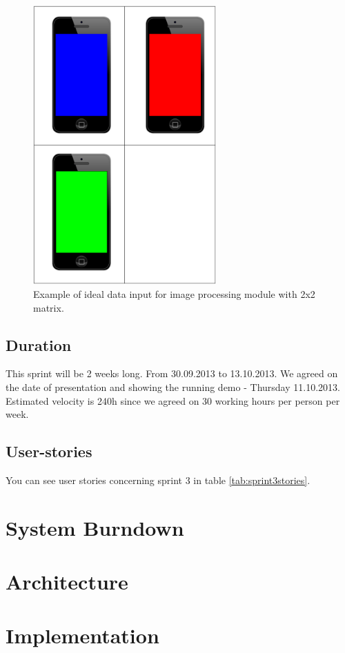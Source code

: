 \begin{figure}[H]
	\centering
		\includegraphics[width=7cm]{sprint3/sprint3_goal.pdf}
	\caption{Example of ideal data input for image processing module with 2x2 matrix.}
	\label{img:sprint3_goal}
\end{figure}


\subsection{Duration}
This sprint will be 2 weeks long. From 30.09.2013 to 13.10.2013.
We agreed on the date of presentation and showing the running demo - Thursday 11.10.2013.
Estimated velocity is 240h since we agreed on 30 working hours per person per week.

\subsection{User-stories}
You can see user stories concerning sprint 3 in table \ref{tab:sprint3stories}.

\section{System Burndown}
\section{Architecture}
\section{Implementation}
